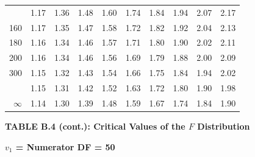 \documentclass[10pt]{article}
\begin{document}
\begin{longtable}{@{}r!{\vrule width 0.8pt\hspace{0.55em}}rrrrrrrrr@{}}
 & 1.17 & 1.36 & 1.48 & 1.60 & 1.74 & 1.84 & 1.94 & 2.07 & 2.17 \\
160 & 1.17 & 1.35 & 1.47 & 1.58 & 1.72 & 1.82 & 1.92 & 2.04 & 2.13 \\
180 & 1.16 & 1.34 & 1.46 & 1.57 & 1.71 & 1.80 & 1.90 & 2.02 & 2.11 \\
200 & 1.16 & 1.34 & 1.46 & 1.56 & 1.69 & 1.79 & 1.88 & 2.00 & 2.09 \\
300 & 1.15 & 1.32 & 1.43 & 1.54 & 1.66 & 1.75 & 1.84 & 1.94 & 2.02 \\
 & 1.15 & 1.31 & 1.42 & 1.52 & 1.63 & 1.72 & 1.80 & 1.90 & 1.98 \\
$\infty$ & 1.14 & 1.30 & 1.39 & 1.48 & 1.59 & 1.67 & 1.74 & 1.84 & 1.90 \\
\end{longtable}
\newpage
\thispagestyle{empty}
\begin{center}
{\large\bfseries TABLE B.4 (cont.): Critical Values of the $F$ Distribution\par}
\end{center}
{\large\bfseries $v_1$ = Numerator DF = 50\par}
\vspace{0.5em}
\small
\end{document}
